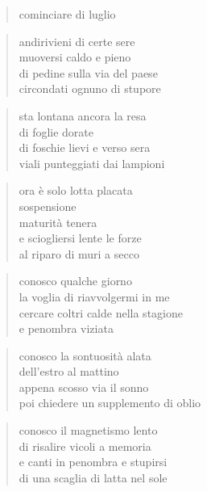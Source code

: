 \clearpage


\begin{verse}
    cominciare di luglio
\end{verse}

\begin{verse}
    andirivieni di certe sere\\
    muoversi caldo e pieno\\
    di pedine sulla via del paese\\
    circondati ognuno di stupore
\end{verse}

\begin{verse}
    sta lontana ancora la resa\\
    di foglie dorate\\
    di foschie lievi e verso sera\\
    viali punteggiati dai lampioni
\end{verse}

\begin{verse}
    ora è solo lotta placata\\
    sospensione\\
    maturità tenera\\
    e sciogliersi lente le forze\\
    al riparo di muri a secco
\end{verse}

\clearpage


\begin{verse}
    conosco qualche giorno\\
    la voglia di riavvolgermi in me\\
    cercare coltri calde nella stagione\\
    e penombra viziata
\end{verse}

\begin{verse}
    conosco la sontuosità alata\\
    dell'estro al mattino\\
    appena scosso via il sonno\\
    poi chiedere un supplemento di oblio
\end{verse}

\begin{verse}
    conosco il magnetismo lento\\
    di risalire vicoli a memoria\\
    e canti in penombra e stupirsi\\
    di una scaglia di latta nel sole
\end{verse}

